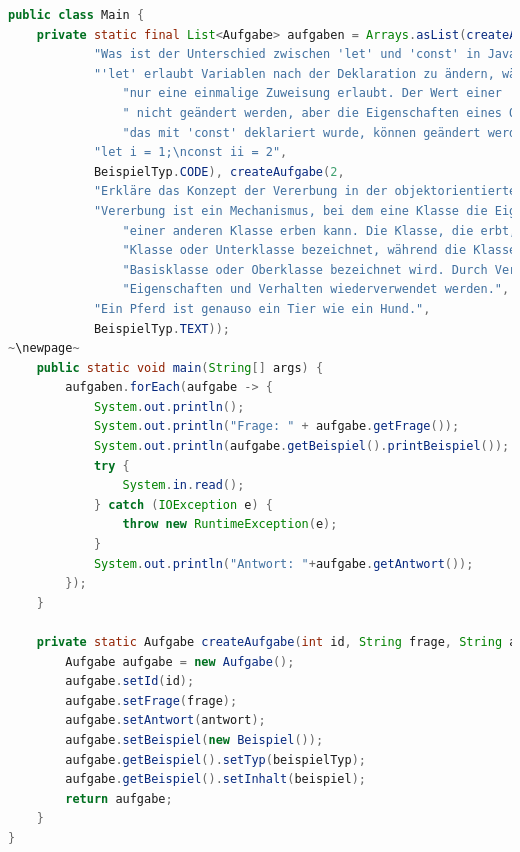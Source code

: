 \documentclass[./einleitung.tex]{subfiles}
\begin{document}
    \begin{lstlisting}[language=Java, caption=Main.java, label=lst:mainJava]
public class Main {
    private static final List<Aufgabe> aufgaben = Arrays.asList(createAufgabe(1,
            "Was ist der Unterschied zwischen 'let' und 'const' in JavaScript?",
            "'let' erlaubt Variablen nach der Deklaration zu ändern, während 'const' " +
                "nur eine einmalige Zuweisung erlaubt. Der Wert einer 'const' Variable kann" +
                " nicht geändert werden, aber die Eigenschaften eines Objekts oder Arrays, " +
                "das mit 'const' deklariert wurde, können geändert werden.",
            "let i = 1;\nconst ii = 2",
            BeispielTyp.CODE), createAufgabe(2,
            "Erkläre das Konzept der Vererbung in der objektorientierten Programmierung.",
            "Vererbung ist ein Mechanismus, bei dem eine Klasse die Eigenschaften und Methoden " +
                "einer anderen Klasse erben kann. Die Klasse, die erbt, wird als abgeleitete " +
                "Klasse oder Unterklasse bezeichnet, während die Klasse, von der geerbt wird, als " +
                "Basisklasse oder Oberklasse bezeichnet wird. Durch Vererbung können gemeinsame " +
                "Eigenschaften und Verhalten wiederverwendet werden.",
            "Ein Pferd ist genauso ein Tier wie ein Hund.",
            BeispielTyp.TEXT));
~\newpage~
    public static void main(String[] args) {
        aufgaben.forEach(aufgabe -> {
            System.out.println();
            System.out.println("Frage: " + aufgabe.getFrage());
            System.out.println(aufgabe.getBeispiel().printBeispiel());
            try {
                System.in.read();
            } catch (IOException e) {
                throw new RuntimeException(e);
            }
            System.out.println("Antwort: "+aufgabe.getAntwort());
        });
    }

    private static Aufgabe createAufgabe(int id, String frage, String antwort, String beispiel, BeispielTyp beispielTyp) {
        Aufgabe aufgabe = new Aufgabe();
        aufgabe.setId(id);
        aufgabe.setFrage(frage);
        aufgabe.setAntwort(antwort);
        aufgabe.setBeispiel(new Beispiel());
        aufgabe.getBeispiel().setTyp(beispielTyp);
        aufgabe.getBeispiel().setInhalt(beispiel);
        return aufgabe;
    }
}
    \end{lstlisting}
\end{document}
